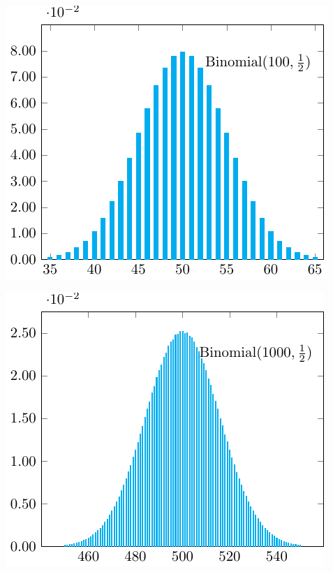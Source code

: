 \begin{minipage}{0.5\textwidth}
    \includegraphics{Figures/normal-random-1.pdf}
\end{minipage}
\begin{minipage}{0.5\textwidth}
    \includegraphics{Figures/normal-random-2.pdf}
\end{minipage}

